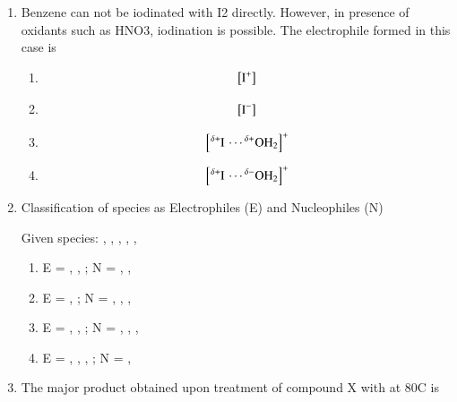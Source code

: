 \documentclass[journal,12pt,onecolumn]{IEEEtran}
\theoremstyle{remark}
\begin{document}
\begin{enumerate}
\begin{multicols}{2}
\begin{enumerate}
\end{enumerate}

\end{multicols}

\item  Benzene can not be iodinated with I2 directly. However, in presence of oxidants such as HNO3, iodination is possible. The electrophile formed in this case is
\hfill{}

\begin{multicols}{4}
    
\begin{enumerate}
   \item   \[
  \left[ \ce{I^+} \right]
  \]
   \item   \[
  \left[ \ce{I^-} \right]
  \]
 \item   \[
  \left[ \ce{^{\delta+}I \cdots ^{\delta+}OH2} \right]^+
  \]

   \item   \[
  \left[ \ce{^{\delta+}I \cdots ^{\delta-}OH2} \right]^+
  \]
  
\end{enumerate}

\end{multicols}

\item Classification of species as Electrophiles (E) and Nucleophiles (N)\hfill{}

Given species: , , , , ,  
 


\begin{enumerate}
   
\item  E = , ,  \quad ; \quad N = , ,  \\
\item  E = ,  \quad ; \quad N = , , ,  \\
\item  E = , ,  \quad ; \quad N = , , ,  \\
\item  E = , , ,  \quad ; \quad N = , 
\end{enumerate}

\item The major product obtained upon treatment of compound X with  at 80\degree C is \hfill{}


\end{enumerate}
\end{document}
